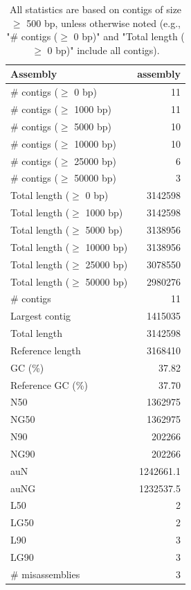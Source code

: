 \documentclass[12pt,a4paper]{article}
\begin{document}
\begin{table}[ht]
\begin{center}
\caption{All statistics are based on contigs of size $\geq$ 500 bp, unless otherwise noted (e.g., "\# contigs ($\geq$ 0 bp)" and "Total length ($\geq$ 0 bp)" include all contigs).}
\begin{tabular}{|l*{1}{|r}|}
\hline
Assembly & assembly \\ \hline
\# contigs ($\geq$ 0 bp) & 11 \\ \hline
\# contigs ($\geq$ 1000 bp) & 11 \\ \hline
\# contigs ($\geq$ 5000 bp) & 10 \\ \hline
\# contigs ($\geq$ 10000 bp) & 10 \\ \hline
\# contigs ($\geq$ 25000 bp) & 6 \\ \hline
\# contigs ($\geq$ 50000 bp) & 3 \\ \hline
Total length ($\geq$ 0 bp) & 3142598 \\ \hline
Total length ($\geq$ 1000 bp) & 3142598 \\ \hline
Total length ($\geq$ 5000 bp) & 3138956 \\ \hline
Total length ($\geq$ 10000 bp) & 3138956 \\ \hline
Total length ($\geq$ 25000 bp) & 3078550 \\ \hline
Total length ($\geq$ 50000 bp) & 2980276 \\ \hline
\# contigs & 11 \\ \hline
Largest contig & 1415035 \\ \hline
Total length & 3142598 \\ \hline
Reference length & 3168410 \\ \hline
GC (\%) & 37.82 \\ \hline
Reference GC (\%) & 37.70 \\ \hline
N50 & 1362975 \\ \hline
NG50 & 1362975 \\ \hline
N90 & 202266 \\ \hline
NG90 & 202266 \\ \hline
auN & 1242661.1 \\ \hline
auNG & 1232537.5 \\ \hline
L50 & 2 \\ \hline
LG50 & 2 \\ \hline
L90 & 3 \\ \hline
LG90 & 3 \\ \hline
\# misassemblies & 3 \\ \hline

\end{tabular}
\end{center}
\end{table}
\end{document}
